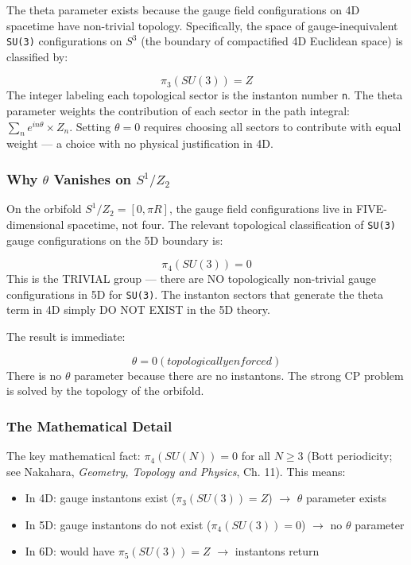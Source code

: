 \documentclass[aps,prd,preprint,superscriptaddress,longbibliography,floatfix]{revtex4-2}
\theoremstyle{remark}
\begin{document}
The theta parameter exists because the gauge field configurations on 4D spacetime have non-trivial topology. Specifically, the space of gauge-inequivalent \texttt{SU(3)} configurations on $S^{3}$ (the boundary of compactified 4D Euclidean space) is classified by:


\begin{equation}
    \pi_{3}(SU(3)) = Z
\end{equation}
The integer labeling each topological sector is the instanton number \texttt{n}. The theta parameter weights the contribution of each sector in the path integral: $\sum_n e^{in\theta} \times Z_n$. Setting $\theta = 0$ requires choosing all sectors to contribute with equal weight --- a choice with no physical justification in 4D.


\subsubsection{Why $\theta$ Vanishes on $S^{1}/Z_{2}$}

On the orbifold $S^{1}/Z_{2} = [0, \pi R]$, the gauge field configurations live in FIVE-dimensional spacetime, not four. The relevant topological classification of \texttt{SU(3)} gauge configurations on the 5D boundary is:


\begin{equation}
    \pi_{4}(SU(3)) = 0
\end{equation}
This is the TRIVIAL group --- there are NO topologically non-trivial gauge configurations in 5D for \texttt{SU(3)}. The instanton sectors that generate the theta term in 4D simply DO NOT EXIST in the 5D theory.

The result is immediate:


\begin{equation}
    \theta = 0 (topologically enforced)
\end{equation}
There is no $\theta$ parameter because there are no instantons. The strong CP problem is solved by the topology of the orbifold.


\subsubsection{The Mathematical Detail}

The key mathematical fact: $\pi_{4}(SU(N)) = 0$ for all $N \geq 3$ (Bott periodicity; see Nakahara, \textit{Geometry, Topology and Physics}, Ch. 11). This means:


\begin{itemize}
  \item In 4D: gauge instantons exist ($\pi_{3}(SU(3)) = Z$) $\to$ $\theta$ parameter exists
  \item In 5D: gauge instantons do not exist ($\pi_{4}(SU(3)) = 0$) $\to$ no $\theta$ parameter
  \item In 6D: would have $\pi_{5}(SU(3)) = Z$ $\to$ instantons return
\end{itemize}
\end{document}
